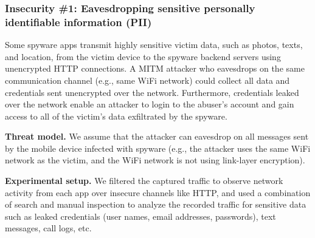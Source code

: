 \documentclass[sigconf,balance=false]{acmart}
\newcommand{\sumanth}[1]{\textcolor{violet}{\noindent[SR: #1]}}
\newcommand{\geoff}[1]{\textcolor{purple}{\noindent[GV: #1]}}
\newcommand{\sumanth}[1]{}
\newcommand{\geoff}[1]{}
\begin{document}


\subsubsection*{Insecurity \#1: Eavesdropping sensitive personally identifiable information (PII)}

Some spyware apps transmit highly sensitive victim data, such as photos,
texts, and location, from the victim device to the spyware backend
servers using unencrypted HTTP connections.  A MITM attacker who
eavesdrops on the same communication channel (e.g., same WiFi network)
could collect all data and credentials sent unencrypted
over the network.  Furthermore, credentials leaked over the network enable
an attacker to login to the abuser's account and gain access to all of
the victim's data exfiltrated by the spyware.

\textbf{Threat model.} We assume that the attacker can eavesdrop on
all messages sent by the mobile device infected with spyware (e.g.,
the attacker uses the same WiFi network as the victim, and the WiFi
network is not using link-layer encryption).



\textbf{Experimental setup.}
We filtered the captured traffic to observe network activity from each app over
insecure channels like HTTP, and used a combination of search and
manual inspection to analyze the recorded traffic for sensitive data
such as leaked credentials (user names, email addresses, passwords),
text messages, call logs, etc.
\end{document}
